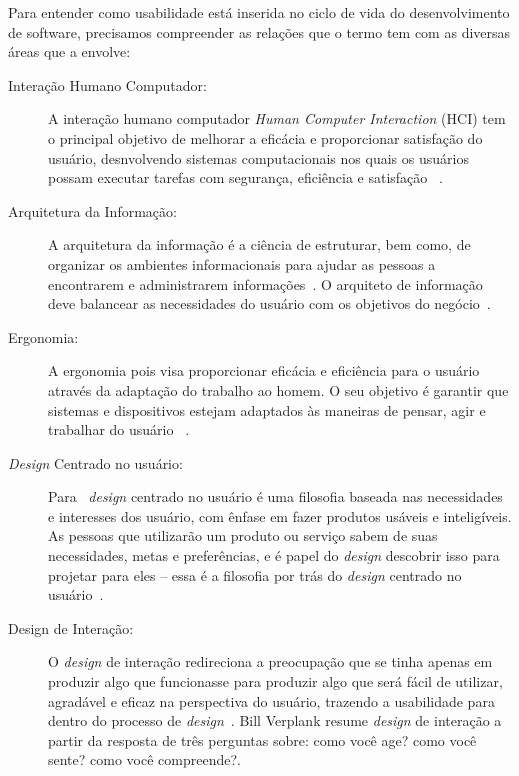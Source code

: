 Para entender como usabilidade está inserida no ciclo de vida do desenvolvimento de software, precisamos compreender as relações que o termo tem com as diversas áreas que a envolve: 

\begin{description}

\item[Interação Humano Computador:]

%
A interação humano computador \emph{Human Computer Interaction} (HCI) tem o principal objetivo de melhorar a eficácia e proporcionar satisfação do usuário, desnvolvendo sistemas computacionais nos quais os usuários possam executar tarefas com segurança, eficiência e satisfação ~\cite{preece2007}.
	
\item[Arquitetura da Informação:]


A arquitetura da informação é a ciência de estruturar, bem como, de organizar os ambientes informacionais para ajudar as pessoas a encontrarem e administrarem informações~\cite{garret2003}.
%
O arquiteto de informação deve balancear as necessidades do usuário com os objetivos do negócio~\cite{rosenfeld1998}.

\item[Ergonomia:]
%
A ergonomia pois visa proporcionar eficácia e eficiência para o usuário através da adaptação do trabalho ao homem.
%
O seu objetivo é garantir que sistemas e dispositivos estejam adaptados às maneiras de pensar, agir e trabalhar do usuário~\cite{cybis2010} .

\item[\emph{Design} Centrado no usuário:]

Para~ \emph{design} centrado no usuário é uma filosofia baseada nas necessidades e interesses dos usuário, com ênfase em fazer produtos usáveis e inteligíveis. 
%
As pessoas que utilizarão um produto ou serviço sabem de suas necessidades, metas e preferências, e é papel do \emph{design} descobrir isso para projetar para eles -- essa é a filosofia por trás do \emph{design} centrado no usuário~\cite{saffer2010designing}.

\item[Design de Interação:]

O \emph{design} de interação redireciona a preocupação que se tinha apenas em produzir algo que funcionasse para produzir algo que será fácil de utilizar, agradável e eficaz na perspectiva do usuário, trazendo a usabilidade para dentro do processo de \emph{design}~\cite{preece2007}.
%
Bill Verplank resume \emph{design} de interação a partir da resposta de três perguntas sobre: como você age? como você sente? como você compreende?\cite{moggridge2006}. 
%



\end{description}
